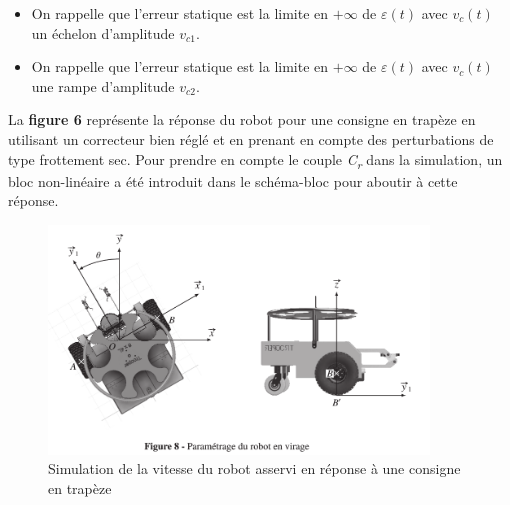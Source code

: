 


\begin{itemize}
\item On rappelle que l'erreur statique est la limite en $+\infty$ de $\varepsilon(t)$ avec $v_c(t)$ un échelon d'amplitude $v_{c1}$.
\item On rappelle que l'erreur statique est la limite en $+\infty$ de $\varepsilon(t)$ avec $v_c(t)$ une rampe d'amplitude $v_{c2}$.
\end{itemize}



La \textbf{figure 6} représente la réponse du robot pour une consigne en
trapèze en utilisant un correcteur bien réglé et en prenant en compte
des perturbations de type frottement sec. Pour prendre en compte le
couple \emph{C\textsubscript{r }}dans la simulation, un bloc
non-linéaire a été introduit dans le schéma-bloc pour aboutir à cette
réponse.


\begin{figure}[!htb]
\begin{center}
\includegraphics[width=0.9\textwidth]{images/image7.png}
\caption{Simulation de la vitesse du robot asservi en réponse à une consigne en trapèze  \label{fig6}}
\end{center}
\end{figure}



